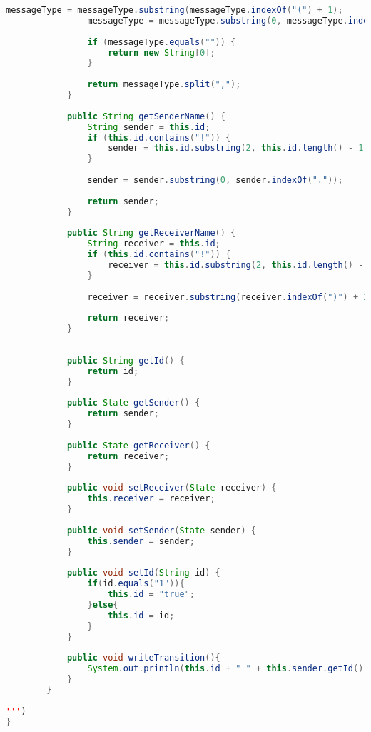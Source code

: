 \begin{lstlisting}[language=java, caption={példa unit teszteset.},captionpos=b]
				messageType = messageType.substring(messageType.indexOf("(") + 1);
				messageType = messageType.substring(0, messageType.indexOf(")"));
		
				if (messageType.equals("")) {
					return new String[0];
				}
				
				return messageType.split(",");
			}
			
			public String getSenderName() {
				String sender = this.id;
				if (this.id.contains("!")) {
					sender = this.id.substring(2, this.id.length() - 1);
				}
				
				sender = sender.substring(0, sender.indexOf("."));
				
				return sender;
			}
			
			public String getReceiverName() {
				String receiver = this.id;
				if (this.id.contains("!")) {
					receiver = this.id.substring(2, this.id.length() - 1);
				}
				
				receiver = receiver.substring(receiver.indexOf(")") + 2);
				
				return receiver;
			}
		
		
			public String getId() {
				return id;
			}
		
			public State getSender() {
				return sender;
			}
		
			public State getReceiver() {
				return receiver;
			}
		
			public void setReceiver(State receiver) {
				this.receiver = receiver;
			}
		
			public void setSender(State sender) {
				this.sender = sender;
			}
		
			public void setId(String id) {
				if(id.equals("1")){
					this.id = "true";
				}else{
					this.id = id;
				}
			}
			
			public void writeTransition(){
				System.out.println(this.id + " " + this.sender.getId() + "->" + this.receiver.getId());
			}
		}
		
''')
}
\end{lstlisting}

